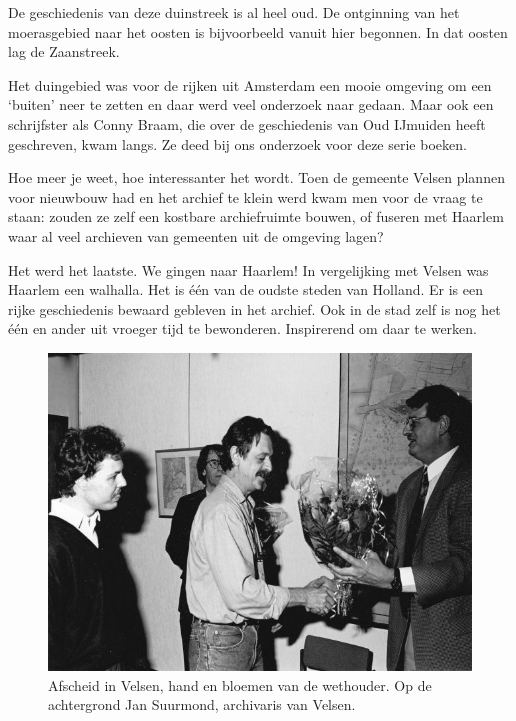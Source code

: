 \documentclass[10pt,twoside, openright]{memoir}
\begin{document}
De geschiedenis van deze duinstreek is al heel oud. De ontginning van het moerasgebied naar het oosten is bijvoorbeeld vanuit hier begonnen. In dat oosten lag de Zaanstreek. 

Het duingebied was voor de rijken uit Amsterdam een mooie omgeving om een `buiten' neer te zetten en daar werd veel onderzoek naar gedaan. Maar ook een schrijfster als Conny Braam, die over de geschiedenis van Oud IJmuiden heeft geschreven, kwam langs. Ze deed bij ons onderzoek voor deze serie boeken.

Hoe meer je weet, hoe interessanter het wordt. Toen de gemeente Velsen plannen voor nieuwbouw had en het archief te klein werd kwam men voor de vraag te staan: zouden ze zelf een kostbare archiefruimte bouwen, of fuseren met Haarlem waar al veel archieven van gemeenten uit de omgeving lagen? 

Het werd het laatste. We gingen naar Haarlem! In vergelijking met Velsen was Haarlem een walhalla. Het is één van de oudste steden van Holland. Er is een rijke geschiedenis bewaard gebleven in het archief. Ook in de stad zelf is nog het één en ander uit vroeger tijd te bewonderen. Inspirerend om daar te werken. 

\begin{figure}
\includegraphics[width=\textwidth]{img/ch47/afscheid}
\caption*{\footnotesize Afscheid in Velsen, hand en bloemen van de wethouder. Op de achtergrond Jan Suurmond, archivaris van Velsen.}
\end{figure}
\end{document}
